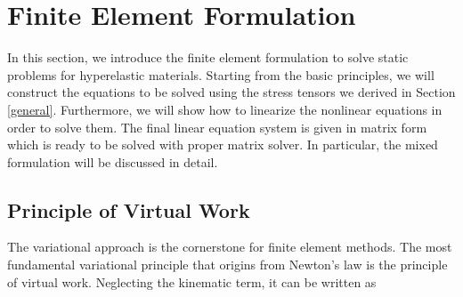 %
\section{Finite Element Formulation}
\label{formulation}
In this section, we introduce the finite element formulation to solve static problems for hyperelastic materials. Starting from the basic principles, we will construct the equations to be solved using the stress tensors we derived in Section \ref{general}. Furthermore, we will show how to linearize the nonlinear equations in order to solve them. The final linear equation system is given in matrix form which is ready to be solved with proper matrix solver. In particular, the mixed formulation will be discussed in detail.

%
\subsection{Principle of Virtual Work} \label{PVW}
The variational approach is the cornerstone for finite element methods. The most fundamental variational principle that origins from Newton's law is the principle of virtual work. Neglecting the kinematic term, it can be written as
